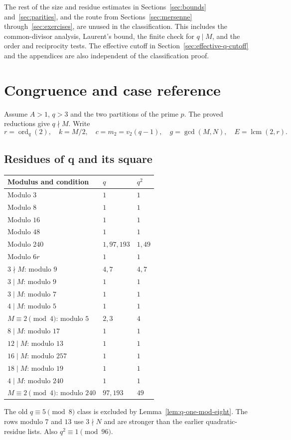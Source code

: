\documentclass[11pt]{article}
\begin{document}
The rest of the size and residue estimates in
Sections~\ref{sec:bounds} and~\ref{sec:parities}, and the route
from Sections~\ref{sec:mersenne} through~\ref{sec:exercises}, are
unused in the classification. This includes the common-divisor
analysis, Laurent's bound, the finite check for $q\mid M$, and the
order and reciprocity tests. The effective cutoff in
Section~\ref{sec:effective-q-cutoff} and the appendices are also
independent of the classification proof.

\appendix
\clearpage
\section{Congruence and case reference}
\label{sec:reference-tables}
Assume $A>1$, $q>3$ and the two partitions of the prime $p$.
The proved reductions give $q\nmid M$. Write
\[
r=\operatorname{ord}_q(2),\quad k=M/2,\quad
c=m_2=v_2(q-1),\quad g=\gcd(M,N),\quad E=\operatorname{lcm}(2,r).
\]

\subsection{Residues of q and its square}
{\small\renewcommand{\arraystretch}{1.15}
\begin{longtable}{@{}p{}p{}p{}@{}}
\textbf{Modulus and condition}&\textbf{$q$}&\textbf{$q^2$}\\\hline
\endhead
Modulo $3$&$1$&$1$\\
Modulo $8$&$1$&$1$\\
Modulo $16$&$1$&$1$\\
Modulo $48$&$1$&$1$\\
Modulo $240$&$1,97,193$&$1,49$\\
Modulo $6r$&$1$&$1$\\\hline
$3\nmid M$: modulo $9$&$4,7$&$4,7$\\
$3\mid M$: modulo $9$&$1$&$1$\\
$3\mid M$: modulo $7$&$1$&$1$\\
$4\mid M$: modulo $5$&$1$&$1$\\
$M\equiv2\pmod4$: modulo $5$&$2,3$&$4$\\
$8\mid M$: modulo $17$&$1$&$1$\\
$12\mid M$: modulo $13$&$1$&$1$\\
$16\mid M$: modulo $257$&$1$&$1$\\
$18\mid M$: modulo $19$&$1$&$1$\\\hline
$4\mid M$: modulo $240$&$1$&$1$\\
$M\equiv2\pmod4$: modulo $240$&$97,193$&$49$\\
\hline
\end{longtable}}
The old $q\equiv5\pmod8$ class is excluded by
Lemma~\ref{lem:q-one-mod-eight}. The rows modulo $7$ and $13$ use
$3\nmid N$ and are stronger than the earlier quadratic-residue lists.
Also $q^2\equiv1\pmod{96}$.
\end{document}
